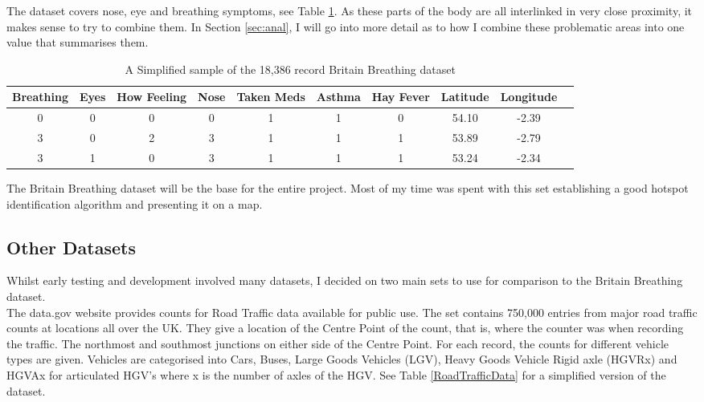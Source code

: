 The dataset covers nose, eye and breathing symptoms, see Table \ref{bbdatatable}. As these parts of the body are all interlinked in very close proximity, it makes sense to try to combine them. In Section \ref{sec:anal}, I will go into more detail as to how I combine these problematic areas into one value that summarises them.\\


\begin{table}[H]
\begin{center}
\begin{tabular}{|c|c|c|c|c|c|c|c|c|c}\hline\hline
Breathing&Eyes&How Feeling&Nose&Taken Meds&Asthma&Hay Fever&Latitude&Longitude\\\hline
0&0&0&0&1&1&0&54.10&-2.39\\
3&0&2&3&1&1&1&53.89&-2.79\\
3&1&0&3&1&1&1&53.24&-2.34\\\hline\hline
\end{tabular}
\end{center}
\caption{A Simplified sample of the 18,386 record Britain Breathing dataset}
\label{bbdatatable}
\end{table}

The Britain Breathing dataset will be the base for the entire project. Most of my time was spent with this set establishing a good hotspot identification algorithm and presenting it on a map.

\subsection{Other Datasets}

Whilst early testing and development involved many datasets, I decided on two main sets to use for comparison to the Britain Breathing dataset.\\

The data.gov website provides counts for Road Traffic data available for public use. The set contains 750,000 entries from major road traffic counts at locations all over the UK. They give a location of the Centre Point of the count, that is, where the counter was when recording the traffic. The northmost and southmost junctions on either side of the Centre Point. For each record, the counts for different vehicle types are given. Vehicles are categorised into Cars, Buses, Large Goods Vehicles (LGV), Heavy Goods Vehicle Rigid axle (HGVRx) and HGVAx for articulated HGV's where x is the number of axles of the HGV. See Table \ref{RoadTrafficData} for a simplified version of the dataset.\\


